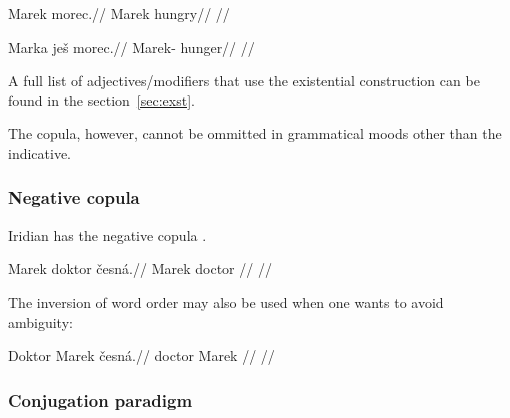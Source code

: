 \pex
\begingl
\gla *Marek morec.//
\glb Marek hungry//
\glft {}//
\endgl
\xe


\pex
\begingl
\gla Marka ješ morec.//
\glb Marek-\Acc{} \Exst{} hunger//
\glft {}//
\endgl
\xe

A full list of adjectives/modifiers that use the existential construction can be
found in the section~\ref{sec:exst}.

The copula, however, cannot be ommitted in grammatical moods other than the
indicative.

\subsubsection{Negative copula}

Iridian has the negative copula .

\pex
\begingl
\gla Marek doktor česná.//
\glb Marek doctor //
\glft {}//
\endgl
\xe

\par The inversion of word order may also be used when one wants to avoid
ambiguity:

\pex
\begingl
\gla Doktor Marek česná.//
\glb doctor Marek //
\glft {}//
\endgl
\xe


\subsubsection{Conjugation paradigm}
